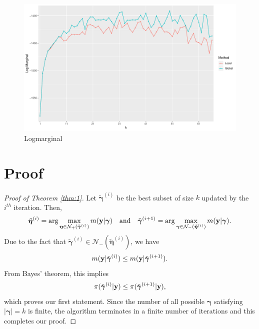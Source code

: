 \documentclass[12pt]{article}
\def\uy{{\bf y}}
\def\bg{{\boldsymbol \gamma}}
\def\ueta{{\boldsymbol \eta}}
\def\ueta{{\boldsymbol \eta}}
\begin{document}
\begin{figure}
  \includegraphics[width=\linewidth]{Log_marginal.pdf}
  \caption{Logmarginal}
  \label{fig:Logmarginal}
\end{figure}




\newpage
\appendix
\section{Proof}\label{app:01}
\begin{proof}[Proof of Theorem \ref{thm:1}] Let $\tilde{\bg}^{(i)}$ be the best subset of size $k$ updated by the $i^{th}$ iteration. Then,
$$\tilde{\ueta}^{(i)}=\arg\max_{\ueta  \in \mathcal{N}_+(\tilde{\bg}^{(i)}  ) } m(\uy|\bg)\quad \text{and}\quad \tilde{\bg}^{(i+1)} = \arg\max_{\bg  \in \mathcal{N}_-(\tilde{\ueta}^{(i)} ) } m(\uy|\bg).$$
Due to the fact that $\tilde{\bg}^{(i)} \in \mathcal{N}_-(\tilde{\ueta}^{(i)} ) $, we have
$$m(\uy|\tilde{\bg}^{(i)} ) \leq m(\uy|\tilde{\bg}^{(i+1)}).$$
From Bayes' theorem, this implies 
$$\pi(\tilde{\bg}^{(i)}|\uy ) \leq \pi(\tilde{\bg}^{(i+1)}|\uy),$$
which proves our first statement.
Since the number of all possible $\bg$ satisfying $|\bg|=k $ is finite, the algorithm terminates in a finite number of iterations and this completes our proof.
\end{proof}
\end{document}
